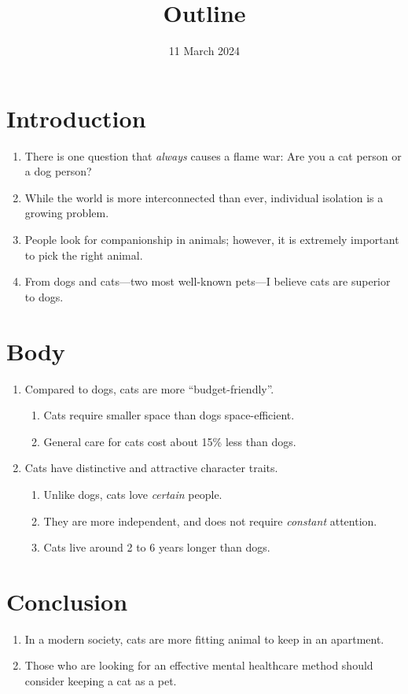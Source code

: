 \documentclass{mla}
\date{11 March 2024}
\title{Outline}
\begin{document}
\section{Introduction}

\begin{enumerate}
\item{There is one question that \textit{always} causes a flame war: Are you a cat person or a dog person?}
\item{While the world is more interconnected than ever, individual isolation is a growing problem.}
\item{People look for companionship in animals; however, it is extremely important to pick the right animal.}
\item{From dogs and cats---two most well-known pets---I believe cats are superior to dogs.}
\end{enumerate}

\section{Body}

\begin{enumerate}
\item{Compared to dogs, cats are more ``budget-friendly''.}
  \begin{enumerate}
  \item{Cats require smaller space than dogs \textrightarrow{} space-efficient.}
  \item{General care for cats cost about 15\% less than dogs.}
  \end{enumerate}
\item{Cats have distinctive and attractive character traits.}
  \begin{enumerate}
  \item{Unlike dogs, cats love \textit{certain} people.}
  \item{They are more independent, and does not require \textit{constant} attention.}
  \item{Cats live around 2 to 6 years longer than dogs.}
  \end{enumerate}
\end{enumerate}

\section{Conclusion}

\begin{enumerate}
\item{In a modern society, cats are more fitting animal to keep in an apartment.}
  \item{Those who are looking for an effective mental healthcare method should consider keeping a cat as a pet.}
\end{enumerate}
\end{document}
